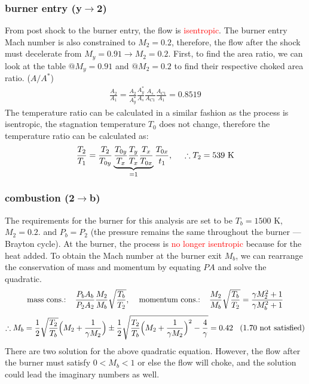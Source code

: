 \documentclass[a4paper,10pt]{article}
\begin{document}
\vspace*{-0.4cm}
\subsubsection{burner entry (y$\rightarrow$2)}
From post shock to the burner entry, the flow is \textcolor{red}{isentropic}. The burner entry Mach number is also constrained to $M_2=0.2$, therefore, the flow after the shock must decelerate from $M_y = 0.91\rightarrow M_2=0.2$. First, to find the area ratio, we can look at the table $@M_y=0.91$ and $@M_2=0.2$ to find their respective choked area ratio. ($A/A^*$)
\begin{gather*}
    \frac{A_2}{A_1} = \frac{A_2}{A^*_y}\frac{A_y^*}{A_s}\frac{A_s}{A_{C1}}\frac{A_{C1}}{A_1} = 0.8519
\end{gather*}
The temperature ratio can be calculated in a similar fashion as the process is isentropic, the stagnation temperature $T_0$ does not change, therefore the temperature ratio can be calculated as:
\begin{gather*}
    \frac{T_2}{T_1}=\frac{T_2}{T_{0y}}\underbrace{\frac{T_{0y}}{T_x}\frac{T_y}{T_x}\frac{T_x}{T_{0x}}}_{=1}\frac{T_{0x}}{t_1},\hspace*{0.5cm}\therefore T_2 = 539\text{ K}
\end{gather*}

\vspace*{-0.4cm}
\subsubsection{combustion (2$\rightarrow$b)}
The requirements for the burner for this analysis are set to be $T_b = 1500$ K, $M_2 = 0.2$. and $P_b=P_2$ (the pressure remains the same throughout the burner --- Brayton cycle). At the burner, the process is \textcolor{red}{no longer isentropic} because for the heat added. To obtain the Mach number at the burner exit $M_b$, we can rearrange the conservation of mass and momentum by equating $PA$ and solve the quadratic. 
\begin{gather*}
    \text{mass cons.:}\hspace*{0.4cm}\frac{P_bA_b}{P_2A_2}\frac{M_2}{M_b}\sqrt{\frac{T_b}{T_2}},\hspace*{0.4cm}\text{momentum cons.:}\hspace*{0.4cm}\frac{M_2}{M_b}\sqrt{\frac{T_b}{T_2}} = \frac{\gamma M_2^2+1}{\gamma M_b^2+1}\\[0.1cm]
    \therefore M_b = \frac{1}{2}\sqrt{\frac{T_2}{T_b}}\Big(M_2+\frac{1}{\gamma M_2}\Big)\pm\frac{1}{2}\sqrt{\frac{T_2}{T_b}\Big(M_2+\frac{1}{\gamma M_2}\Big)^2-\frac{4}{\gamma}} = 0.42\hspace*{0.3cm}(1.70\text{ not satisfied})
\end{gather*}
There are two solution for the above quadratic equation. However, the flow after the burner must satisfy $0<M_b<1$ or else the flow will choke, and the solution could lead the imaginary numbers as well.\par 
\end{document}
